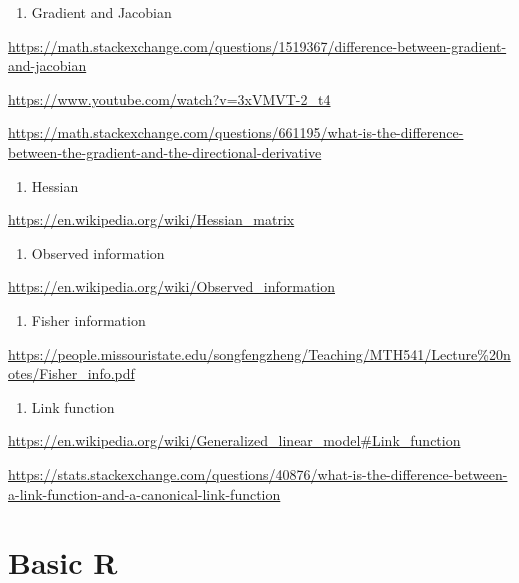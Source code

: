 \documentclass[]{book}
\providecommand{\tightlist}{%
  \setlength{\itemsep}{0pt}\setlength{\parskip}{0pt}}
\begin{document}
\begin{enumerate}
\def\labelenumi{\arabic{enumi}.}
\setcounter{enumi}{3}
\tightlist
\item
  Gradient and Jacobian
\end{enumerate}

\url{https://math.stackexchange.com/questions/1519367/difference-between-gradient-and-jacobian}

\url{https://www.youtube.com/watch?v=3xVMVT-2_t4}

\url{https://math.stackexchange.com/questions/661195/what-is-the-difference-between-the-gradient-and-the-directional-derivative}

\begin{enumerate}
\def\labelenumi{\arabic{enumi}.}
\setcounter{enumi}{4}
\tightlist
\item
  Hessian
\end{enumerate}

\url{https://en.wikipedia.org/wiki/Hessian_matrix}

\begin{enumerate}
\def\labelenumi{\arabic{enumi}.}
\setcounter{enumi}{5}
\tightlist
\item
  Observed information
\end{enumerate}

\url{https://en.wikipedia.org/wiki/Observed_information}

\begin{enumerate}
\def\labelenumi{\arabic{enumi}.}
\setcounter{enumi}{6}
\tightlist
\item
  Fisher information
\end{enumerate}

\url{https://people.missouristate.edu/songfengzheng/Teaching/MTH541/Lecture\%20notes/Fisher_info.pdf}

\begin{enumerate}
\def\labelenumi{\arabic{enumi}.}
\setcounter{enumi}{7}
\tightlist
\item
  Link function
\end{enumerate}

\url{https://en.wikipedia.org/wiki/Generalized_linear_model\#Link_function}

\url{https://stats.stackexchange.com/questions/40876/what-is-the-difference-between-a-link-function-and-a-canonical-link-function}

\hypertarget{basic-r}{%
\chapter{Basic R}\label{basic-r}}
\end{document}
